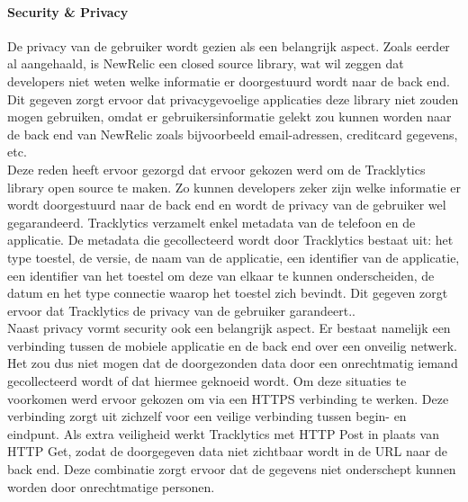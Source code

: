 \paragraph{Security \& Privacy}
De privacy van de gebruiker wordt gezien als een belangrijk aspect. Zoals eerder al aangehaald, is NewRelic een closed source library, wat wil zeggen dat developers niet weten welke informatie er doorgestuurd wordt naar de back end. Dit gegeven zorgt ervoor dat privacygevoelige applicaties deze library niet zouden mogen gebruiken, omdat er gebruikersinformatie gelekt zou kunnen worden naar de back end van NewRelic zoals bijvoorbeeld email-adressen, creditcard gegevens, etc.\\
Deze reden heeft ervoor gezorgd dat ervoor gekozen werd om de Tracklytics library open source te maken. Zo kunnen developers zeker zijn welke informatie er wordt doorgestuurd naar de back end en wordt de privacy van de gebruiker wel gegarandeerd. Tracklytics verzamelt enkel metadata van de telefoon en de applicatie. De metadata die gecollecteerd wordt door Tracklytics bestaat uit: het type toestel, de versie, de naam van de applicatie, een identifier van de applicatie, een identifier van het toestel om deze van elkaar te kunnen onderscheiden, de datum en het type connectie waarop het toestel zich bevindt. Dit gegeven zorgt ervoor dat Tracklytics de privacy van de gebruiker garandeert..\\

Naast privacy vormt security ook een belangrijk aspect. Er bestaat namelijk een verbinding tussen de mobiele applicatie en de back end over een onveilig netwerk. Het zou dus niet mogen dat de doorgezonden data door een onrechtmatig iemand gecollecteerd wordt of dat hiermee geknoeid wordt. Om deze situaties te voorkomen werd ervoor gekozen om via een HTTPS verbinding te werken. Deze verbinding zorgt uit zichzelf voor een veilige verbinding tussen begin- en eindpunt. Als extra veiligheid werkt Tracklytics met HTTP Post in plaats van HTTP Get, zodat de doorgegeven data niet zichtbaar wordt in de URL naar de back end. Deze combinatie zorgt ervoor dat de gegevens niet onderschept kunnen worden door onrechtmatige personen. 




